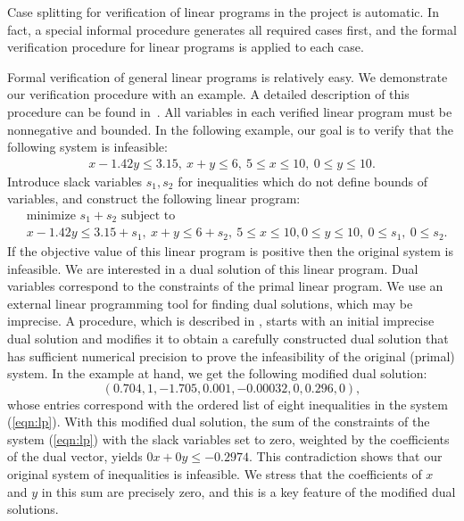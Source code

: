 Case splitting for verification of linear programs in the project is
automatic. In fact, a special informal procedure generates all required
cases first, and the formal verification procedure for linear programs is
applied to each case.

Formal verification of general linear programs is relatively easy. We
demonstrate our verification procedure with an example. A detailed
description of this procedure can be found in~\cite{Solovyev:LP}. All
variables in each verified linear program must be nonnegative and
bounded. In the following example, our goal is to verify that the following system is
infeasible:
\begin{equation*}
\begin{split}
x - 1.42 y \le 3.15,\ x + y \le 6,\ 
5 \le x \le 10,\ 0 \le y \le 10.
\end{split}
\end{equation*}
Introduce slack variables $s_1, s_2$ for inequalities which do not
define bounds of variables, and construct the following linear program:
\begin{equation}\label{eqn:lp}
\begin{split}
&\text{minimize $s_1 + s_2$ subject to}\\
&x - 1.42 y \le 3.15 + s_1,\ x + y \le 6 + s_2,\ 
5 \le x \le 10, 0 \le y \le 10,\ 
0 \le s_1,\ 0 \le  s_2.
\end{split}
\end{equation}
If the objective value of this linear program is positive then the
original system is infeasible. We are interested in a dual solution of
this linear program. Dual variables correspond to the constraints of
the primal linear program. We use an external linear programming tool
for finding dual solutions, which may be imprecise.  A procedure,
which is described in \cite{Solovyev:LP}, starts with an initial
imprecise dual solution and modifies it to obtain a carefully
constructed dual solution that has sufficient numerical precision to
prove the infeasibility of the original (primal) system.  In the
example at hand, we get the following modified dual solution:
\[
 (0.704, 1, -1.705, 0.001, -0.00032, 0, 0.296, 0),
\]
whose entries correspond with the ordered list of eight inequalities in the system
(\ref{eqn:lp}).  With this modified dual solution, the sum of the
constraints of the system (\ref{eqn:lp}) with the slack variables set
to zero, weighted by the coefficients of the dual vector, yields $0 x
+ 0 y \le -0.2974$. This contradiction shows that our original system
of inequalities is infeasible.  We stress that the coefficients of $x$
and $y$ in this sum are precisely zero, and this is a key feature of
the modified dual solutions.

